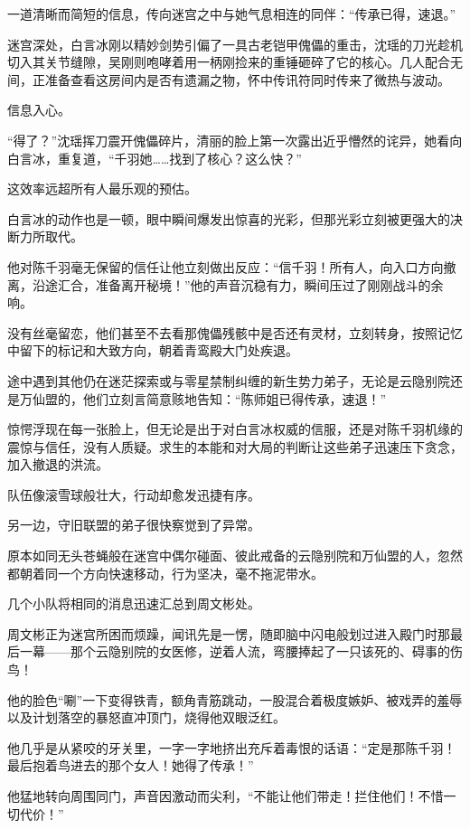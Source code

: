 \vspace{2em}

一道清晰而简短的信息，传向迷宫之中与她气息相连的同伴：“传承已得，速退。”

迷宫深处，白言冰刚以精妙剑势引偏了一具古老铠甲傀儡的重击，沈瑶的刀光趁机切入其关节缝隙，吴刚则咆哮着用一柄刚捡来的重锤砸碎了它的核心。几人配合无间，正准备查看这房间内是否有遗漏之物，怀中传讯符同时传来了微热与波动。

信息入心。

“得了？”沈瑶挥刀震开傀儡碎片，清丽的脸上第一次露出近乎懵然的诧异，她看向白言冰，重复道，“千羽她……找到了核心？这么快？”

这效率远超所有人最乐观的预估。

白言冰的动作也是一顿，眼中瞬间爆发出惊喜的光彩，但那光彩立刻被更强大的决断力所取代。

他对陈千羽毫无保留的信任让他立刻做出反应：“信千羽！所有人，向入口方向撤离，沿途汇合，准备离开秘境！”他的声音沉稳有力，瞬间压过了刚刚战斗的余响。

没有丝毫留恋，他们甚至不去看那傀儡残骸中是否还有灵材，立刻转身，按照记忆中留下的标记和大致方向，朝着青鸾殿大门处疾退。

途中遇到其他仍在迷茫探索或与零星禁制纠缠的新生势力弟子，无论是云隐别院还是万仙盟的，他们立刻言简意赅地告知：“陈师姐已得传承，速退！”

惊愕浮现在每一张脸上，但无论是出于对白言冰权威的信服，还是对陈千羽机缘的震惊与信任，没有人质疑。求生的本能和对大局的判断让这些弟子迅速压下贪念，加入撤退的洪流。

队伍像滚雪球般壮大，行动却愈发迅捷有序。

另一边，守旧联盟的弟子很快察觉到了异常。

原本如同无头苍蝇般在迷宫中偶尔碰面、彼此戒备的云隐别院和万仙盟的人，忽然都朝着同一个方向快速移动，行为坚决，毫不拖泥带水。

几个小队将相同的消息迅速汇总到周文彬处。

周文彬正为迷宫所困而烦躁，闻讯先是一愣，随即脑中闪电般划过进入殿门时那最后一幕——那个云隐别院的女医修，逆着人流，弯腰捧起了一只该死的、碍事的伤鸟！

他的脸色“唰”一下变得铁青，额角青筋跳动，一股混合着极度嫉妒、被戏弄的羞辱以及计划落空的暴怒直冲顶门，烧得他双眼泛红。

他几乎是从紧咬的牙关里，一字一字地挤出充斥着毒恨的话语：“定是那陈千羽！最后抱着鸟进去的那个女人！她得了传承！”

他猛地转向周围同门，声音因激动而尖利，“不能让他们带走！拦住他们！不惜一切代价！”

